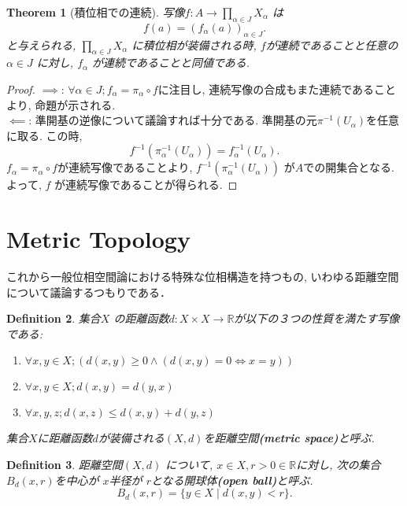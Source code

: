 \documentclass[lualatex]{ltjsbook}
\newtheorem{theorem}{Theorem}[chapter]
\newtheorem{definition}[theorem]{Definition}
\theoremstyle{remark}
\theoremstyle{plain}
\begin{document}
\begin{theorem}[積位相での連続]
	写像$f: A\to  \prod_{\alpha \in J} X_{\alpha}  $ は
	\[
	f(a) = (f_{\alpha}(a))_{\alpha \in J}
	.\] 
	と与えられる,  $\prod_{\alpha \in J} X_{\alpha}  $ に積位相が装備される時,  $f$が連続であることと任意の $\alpha \in J$ に対し,  $f_{\alpha}$ が連続であることと同値である.
\end{theorem}

\begin{proof}
	$\implies$: $\forall \alpha \in J; f_{\alpha} = \pi_{\alpha} \circ f$に注目し,  連続写像の合成もまた連続であることより,  命題が示される.\\
	 $\impliedby$: 準開基の逆像について議論すれば十分である. 準開基の元$\pi^{-1}\left( U_{\alpha}\right) $を任意に取る. この時,  
	  \[
	 f^{-1}\left(\pi_{\alpha} ^{-1} \left( U_{\alpha}  \right) \right) = f_{\alpha}^{-1}\left( U_{\alpha} \right) 
	 .\] 
	 $f_{\alpha} = \pi_{\alpha} \circ f$が連続写像であることより,  
	 $f^{-1} \left( \pi_{\alpha} ^{-1}\left( U_{\alpha} \right)  \right) $ が$A$での開集合となる. 
	 よって,   $f$ が連続写像であることが得られる. 
\end{proof}


\section{Metric Topology}
これから一般位相空間論における特殊な位相構造を持つもの,  
いわゆる距離空間について議論するつもりである．


\begin{definition}
	集合$X$ の距離函数$d : X \times X \to \mathbb{R}$が以下の３つの性質を満たす写像である:
	\begin{enumerate}
		\item $\forall x  ,  y \in X ; \left( d(x, y) \ge 0 \land \left( d(x, y) = 0  \iff x = y \right) \right)$ 
		\item $\forall x,  y \in X; d(x, y) = d(y, x)$
		\item  $\forall x, y, z ; d(x, z) \le d(x, y) + d(y, z)$
	\end{enumerate}
	集合$X$に距離函数$d$が装備される$(X, d)$を距離空間\textbf{(metric space)}と呼ぶ.
\end{definition}

\begin{definition}
	距離空間$\left( X, d \right) $ について,  $x \in X,  r>0 \in  \mathbb{R}$に対し,  次の集合$B_d (x, r)$を中心が $x$半径が $r$となる開球体\textbf{(open ball)}と呼ぶ.
	 \[
	B_d(x, r) = \{y \in X \mid d(x, y) <r\} 
	.\] 
\end{definition}
\end{document}

